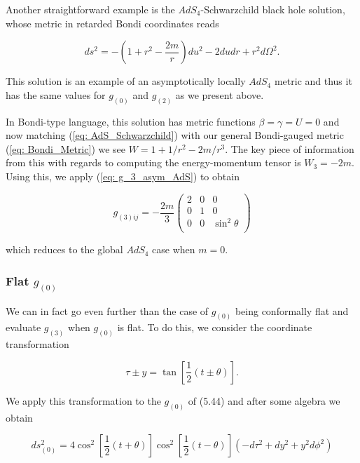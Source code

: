 \documentclass[a4paper,11pt]{article}
\numberwithin{equation}{section}
\begin{document}
Another straightforward example is the $AdS_4$-Schwarzchild black hole solution, whose metric in retarded Bondi coordinates reads 

\begin{equation} \label{eq: AdS_Schwarzchild}
ds^2=-\left(1+r^2-\frac{2m}{r}\right)du^2-2du dr+r^2 d\Omega^2.
\end{equation}

\noindent This solution is an example of an asymptotically locally $AdS_4$ metric and thus it has the same values for $g_{(0)}$ and $g_{(2)}$ as we present above. \par

In Bondi-type language, this solution has metric functions $\beta=\gamma=U=0$ and now matching (\ref{eq: AdS_Schwarzchild}) with our general Bondi-gauged metric (\ref{eq: Bondi_Metric}) we see $W=1+1/r^2-2m/r^3$. The key piece of information from this with regards to computing the energy-momentum tensor is $W_{3}=-2m$. Using this, we apply (\ref{eq: g_3_asym_AdS}) to obtain

\begin{equation}
g_{(3) ij}= -\frac{2m}{3} \left( \begin{array}{ccc} 
2 & 0 & 0 \\
0 & 1 & 0 \\
0 & 0 & \sin^2 \theta \\
\end{array} \right)
\end{equation}

\noindent which reduces to the global $AdS_4$ case when $m=0$.

\subsubsection{Flat $g_{(0)}$}

We can in fact go even further than the case of $g_{(0)}$ being conformally flat and evaluate $g_{(3)}$ when $g_{(0)}$ is flat. To do this, we consider the coordinate transformation 

\begin{equation}
\tau \pm y = \tan\left[ \frac{1}{2}(t\pm \theta) \right].
\end{equation}

\noindent We apply this transformation to the $g_{(0)}$ of (5.44) and after some algebra we obtain 

\begin{equation} \label{eq: conformal_flat_g_0}
ds_{(0)}^2=4 \cos^2 \left[ \frac{1}{2}(t+ \theta) \right] \cos^2 \left[ \frac{1}{2}(t- \theta) \right] (-d\tau^2 + dy^2 + y^2d\phi^2 )
\end{equation}
\end{document}
